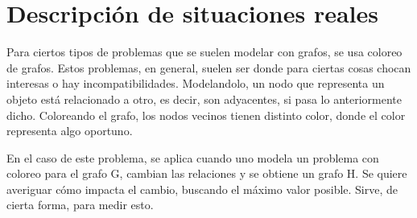 \section{Descripción de situaciones reales}

\quad Para ciertos tipos de problemas que se suelen modelar con grafos, se usa coloreo de grafos. Estos problemas, en general, suelen ser donde para ciertas cosas chocan interesas o hay incompatibilidades. Modelandolo, un nodo que representa un objeto está relacionado a otro, es decir, son adyacentes, si pasa lo anteriormente dicho. Coloreando el grafo, los nodos vecinos tienen distinto color, donde el color representa algo oportuno.

\quad

\quad En el caso de este problema, se aplica cuando uno modela un problema con coloreo para el grafo G, cambian las relaciones y se obtiene un grafo H. Se quiere averiguar cómo impacta el cambio, buscando el máximo valor posible. Sirve, de cierta forma, para medir esto.